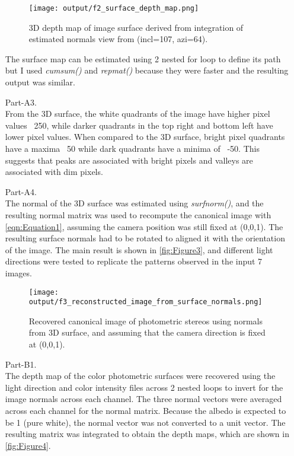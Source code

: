 \documentclass[12pt]{report}
\begin{document}
\begin{enumerate}
    \begin{figure}[H]
        \centering
        \texttt{[image: output/f2\_surface\_depth\_map.png]}
        \caption{3D depth map of image surface derived from integration of estimated normals view from (incl=107, azi=64).}
        \label{fig:Figure1}
    \end{figure}

    \FloatBarrier 

    The surface map can be estimated using 2 nested for loop to define its path but I used \emph{cumsum()} and \emph{repmat()} because they were faster and the 
    resulting output was similar.

    \item[Part-A3.]
    \ \\
    From the 3D surface, the white quadrants of the image have higher pixel values ~250, while darker quadrants in the top right and bottom left have lower pixel 
    values. When compared to the 3D surface, bright pixel quadrants have a maxima ~50 while dark quadrants have a minima of ~-50. This suggests that peaks are 
    associated with bright pixels and valleys are associated with dim pixels.

    \item[Part-A4.]
    \ \\
    The normal of the 3D surface was estimated using \emph{surfnorm()}, and the resulting normal matrix was used to recompute the canonical image with 
    \autoref{eqn:Equation1}, assuming the camera position was still fixed at (0,0,1). The resulting surface normals had to be rotated to aligned it with the orientation 
    of the image. The main result is shown in \autoref{fig:Figure3}, and different light directions were tested to replicate the patterns observed in the input 7 images.

    \begin{figure}[H]
        \centering
        \texttt{[image: output/f3\_reconstructed\_image\_from\_surface\_normals.png]}
        \caption{Recovered canonical image of photometric stereos using normals from 3D surface, and assuming that the camera direction is fixed at (0,0,1).}
        \label{fig:Figure3}
    \end{figure}

    \FloatBarrier 

    \item[Part-B1.]
    \ \\
    The depth map of the color photometric surfaces were recovered using the light direction and color intensity files across 2 nested loops to invert for the 
    image normals across each channel. The three normal vectors were averaged across each channel for the normal matrix. Because the albedo is expected to be 1 
    (pure white), the normal vector was not converted to a unit vector. The resulting matrix was integrated to obtain the depth maps, which are shown in 
    \autoref{fig:Figure4}.


\end{enumerate}
\end{document}
